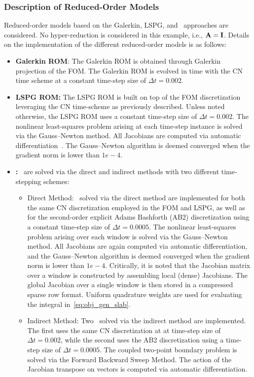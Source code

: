 \subsubsection{Description of Reduced-Order Models}
Reduced-order models based on the Galerkin, LSPG, and \methodAcronym\ approaches are considered. No hyper-reduction is considered 
in this example, i.e., $\mathbf{A} = \mathbf{I}$. Details on the implementation of the 
different reduced-order models is as follows:
\begin{itemize}
\item \textbf{Galerkin ROM}: The Galerkin ROM is obtained through Galerkin projection of the FOM. The Galerkin ROM is evolved in time with the CN time scheme at 
a constant time-step size of $ \Delta t = 0.002$.

\item \textbf{LSPG ROM:} The LSPG ROM is built on top of the FOM discretization leveraging the CN time-scheme as previously described. Unless noted otherwise, the LSPG ROM uses a constant time-step size of $\Delta t = 0.002$. The nonlinear least-squares problem arising at each time-step instance is solved via the Gauss--Newton method. All Jacobians are computed via automatic differentiation~\cite{adolc}. The Gauss--Newton algorithm is deemed converged when the gradient norm is lower than $1e-4$. 
\item \textbf{\methodAcronymROM:} \methodAcronymROMs\ are solved via the direct and indirect methods with two different time-stepping schemes: 
\begin{itemize}
\item Direct Method: \methodAcronymROMs\ solved via the direct method are implemented for both the same CN discretization employed in the FOM and LSPG, as well as for the second-order explicit Adams Bashforth (AB2) discretization using a constant time-step size of $\Delta t = 0.0005$. The nonlinear least-squares problem 
arising over each window is solved via the Gauss--Newton method. All Jacobians are again computed via automatic differentiation, and the Gauss--Newton algorithm is deemed converged when the gradient norm is lower than $1e-4$. Critically, it is noted that the Jacobian 
matrix over a window is constructed by assembling local (dense) Jacobians. The global Jacobian over a single window is then stored in a compressed sparse row format. Uniform quadrature weights are used for evaluating the integral in~\eqref{eq:obj_gen_slab}. 

\item Indirect Method: Two \methodAcronymROMs\ solved via the indirect method are implemented. The first uses the same CN discretization at at time-step size of $\Delta t = 0.002$, while the second uses the AB2 discretization using a time-step size of $\Delta t = 0.0005$. The coupled two-point boundary 
problem is solved via the Forward Backward Sweep Method. The action of the Jacobian transpose on vectors is computed via automatic differentiation. 
\end{itemize}
\end{itemize}


